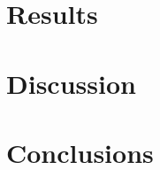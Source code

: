 \documentclass[twoside]{article}
\begin{document}
\begin{multicols}{2}
\section{Results}

\section{Discussion} %

\section{Conclusions}

 
\printbibliography


\end{multicols}

\begin{appendices}
\end{appendices}
\end{document}
